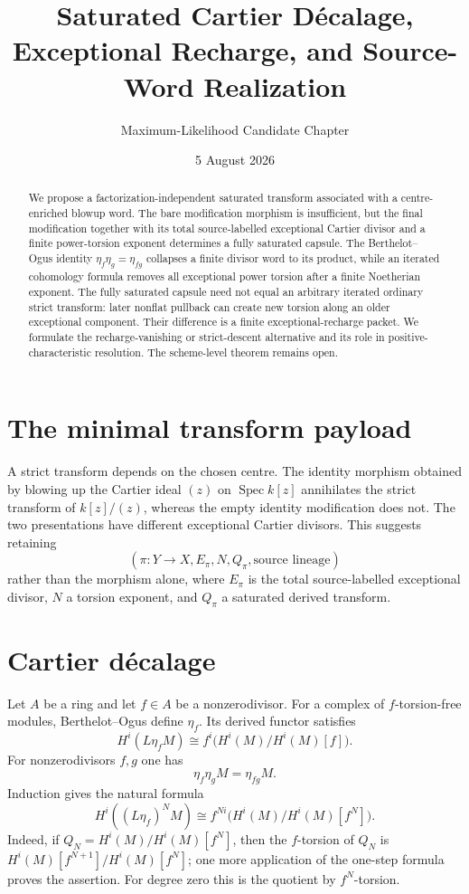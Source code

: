 \documentclass[11pt]{amsart}
\title{Saturated Cartier D\'ecalage, Exceptional Recharge, and Source-Word Realization}
\author{Maximum-Likelihood Candidate Chapter}
\date{5 August 2026}
\begin{document}
\maketitle

\begin{abstract}
We propose a factorization-independent saturated transform associated with a
centre-enriched blowup word.  The bare modification morphism is insufficient,
but the final modification together with its total source-labelled exceptional
Cartier divisor and a finite power-torsion exponent determines a fully
saturated capsule.  The Berthelot--Ogus identity
$\eta_f\eta_g=\eta_{fg}$ collapses a finite divisor word to its product, while
an iterated cohomology formula removes all exceptional power torsion after a
finite Noetherian exponent.  The fully saturated capsule need not equal an
arbitrary iterated ordinary strict transform: later nonflat pullback can create
new torsion along an older exceptional component.  Their difference is a
finite exceptional-recharge packet.  We formulate the recharge-vanishing or
strict-descent alternative and its role in positive-characteristic
resolution.  The scheme-level theorem remains open.
\end{abstract}

\section{The minimal transform payload}
A strict transform depends on the chosen centre.  The identity morphism
obtained by blowing up the Cartier ideal $(z)$ on $\operatorname{Spec}k[z]$
annihilates the strict transform of $k[z]/(z)$, whereas the empty identity
modification does not.  The two presentations have different exceptional
Cartier divisors.  This suggests retaining
\[
 (\pi:Y\to X, E_\pi, N, Q_\pi,\text{source lineage})
\]
rather than the morphism alone, where $E_\pi$ is the total source-labelled
exceptional divisor, $N$ a torsion exponent, and $Q_\pi$ a saturated derived
transform.

\section{Cartier d\'ecalage}
Let $A$ be a ring and let $f\in A$ be a nonzerodivisor.  For a complex of
$f$-torsion-free modules, Berthelot--Ogus define $\eta_f$.  Its derived functor
satisfies
\[
 H^i(L\eta_fM)\cong f^i\bigl(H^i(M)/H^i(M)[f]\bigr).
\]
For nonzerodivisors $f,g$ one has
\[
 \eta_f\eta_gM=\eta_{fg}M.
\]
Induction gives the natural formula
\[
 H^i((L\eta_f)^NM)
 \cong f^{Ni}\bigl(H^i(M)/H^i(M)[f^N]\bigr).
\]
Indeed, if $Q_N=H^i(M)/H^i(M)[f^N]$, then the $f$-torsion of $Q_N$ is
$H^i(M)[f^{N+1}]/H^i(M)[f^N]$; one more application of the one-step formula
proves the assertion.  For degree zero this is the quotient by $f^N$-torsion.
\end{document}
